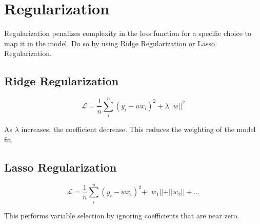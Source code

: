 \section{Regularization}

Regularization penalizes complexity in the loss function for a specific choice to map it in the model. Do so by using Ridge Regularization or Lasso Regularization. 

\subsection*{Ridge Regularization}

$$\mathcal{L}=\frac{1}{n}\sum_i^n(y_i-wx_i)^2+\lambda \vert\vert w\vert\vert^2$$

As $\lambda$ increases, the coefficient decrease. This reduces the weighting of the model fit.

\subsection*{Lasso Regularization}

$$\mathcal{L}=\frac{1}{n}\sum_i^n(y_i-wx_i)^2+\vert\vert w_1\vert\vert+\vert\vert w_2\vert\vert+...$$

This performs variable selection by ignoring coefficients that are near zero.




